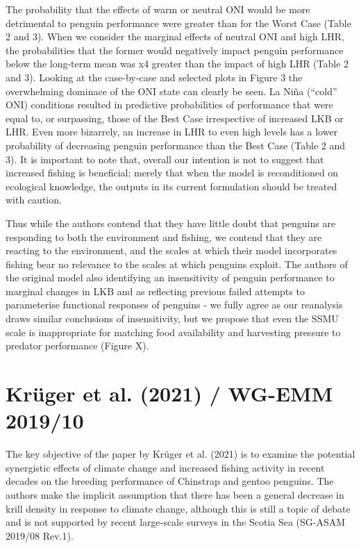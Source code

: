 \documentclass[]{elsarticle} %
\begin{document}
The probability that the effects of warm or neutral ONI would be more
detrimental to penguin performance were greater than for the Worst Case
(Table 2 and 3). When we consider the marginal effects of neutral ONI
and high LHR, the probabilities that the former would negatively impact
penguin performance below the long-term mean was x4 greater than the
impact of high LHR (Table 2 and 3). Looking at the case-by-case and
selected plots in Figure 3 the overwhelming dominace of the ONI state
can clearly be seen. La Niña (``cold'' ONI) conditions resulted in
predictive probabilities of performance that were equal to, or
surpassing, those of the Best Case irrespective of increased LKB or LHR.
Even more bizarrely, an increase in LHR to even high levels has a lower
probability of decreasing penguin performance than the Best Case (Table
2 and 3). It is important to note that, overall our intention is not to
suggest that increased fishing is beneficial; merely that when the model
is reconditioned on ecological knowledge, the outputs in its current
formulation should be treated with caution.

Thus while the authors contend that they have little doubt that penguins
are responding to both the environment and fishing, we contend that they
are reacting to the environment, and the scales at which their model
incorporates fishing bear no relevance to the scales at which penguins
exploit. The authors of the original model also identifying an
insensitivity of penguin performance to marginal changes in LKB and as
reflecting previous failed attempts to parameterise functional responses
of penguins - we fully agree as our reanalysis draws similar conclusions
of insensitivity, but we propose that even the SSMU scale is
inappropriate for matching food availability and harvesting pressure to
predator performance (Figure X).

\hypertarget{kruger2021-wg-emm-201910}{%
\section{Krüger et al. (2021) / WG-EMM
2019/10}\label{kruger2021-wg-emm-201910}}

The key objective of the paper by Krüger et al. (2021) is to examine the
potential synergistic effects of climate change and increased fishing
activity in recent decades on the breeding performance of Chinstrap and
gentoo penguins. The authors make the implicit assumption that there has
been a general decrease in krill density in response to climate change,
although this is still a topic of debate and is not supported by recent
large-scale surveys in the Scotia Sea (SG-ASAM 2019/08 Rev.1).
\end{document}
